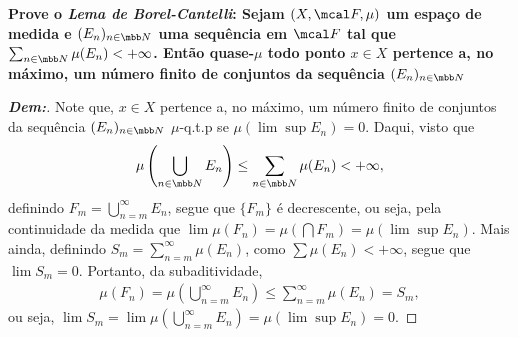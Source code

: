\newpage 
{}
\myexe{\thedois}
\bigline 
\textbf{Prove o \textit{Lema de Borel-Cantelli}: Sejam $(X, \mcal F, \mu)$ um espaço 
de medida e $(E_n)_{n \in \mbb N}$ uma sequência em $\mcal F$ tal que 
$\sum_{n \in \mbb N} \mu(E_n) < +\infty$. Então quase-$\mu$ todo ponto $x \in X$ pertence a, 
no máximo, um número finito de conjuntos da sequência $(E_n)_{n \in \mbb N}$}
\begin{proof}[\textbf{Dem:}] Note que, $x\in X$ pertence a, no máximo, um número 
  finito de conjuntos da sequência $(E_n)_{n \in \mbb N}$ $\mu$-q.t.p se 
  $\mu(\lim\sup E_n) = 0$. Daqui, visto que 
  \begin{align*}
    \mu\left(\bigcup\limits_{n \in \mbb N}
    E_n\right) \le \sum_{n \in \mbb N} \mu(E_n) < +\infty,
  \end{align*}
  definindo $F_m = \bigcup_{n = m}^\infty E_n$, 
  segue que $\{F_m\}$ é decrescente, ou seja, 
  pela continuidade da medida que $\lim \mu (F_n) = \mu(\bigcap F_m) = \mu(\lim\sup E_n)$. 
  Mais ainda, definindo $S_m = \sum_{n = m}^\infty \mu(E_n)$, como $\sum \mu(E_n) < +\infty$,
  segue que $\lim S_m = 0$. Portanto, da subaditividade, 
  \begin{align*}
    \mu(F_n) = \mu\left(\bigcup\limits_{n = m}^\infty E_n\right)
    \le \sum_{n = m}^\infty \mu(E_n) = S_m,
  \end{align*}
  ou seja, $\lim S_m = \lim \mu\left(\bigcup\limits_{n = m}^\infty E_n\right) 
  = \mu(\lim\sup E_n) = 0$.
\end{proof}
\biglinend

